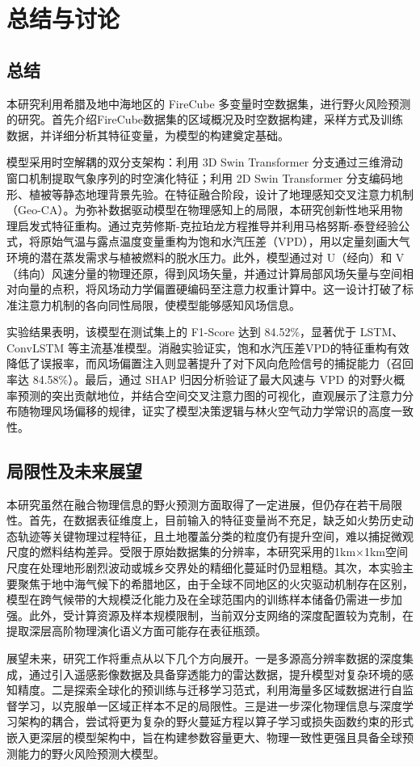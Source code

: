 \chapter{总结与讨论}
\label{chap:conclusion}

\section{总结}

本研究利用希腊及地中海地区的 FireCube 多变量时空数据集，进行野火风险预测的研究。首先介绍FireCube数据集的区域概况及时空数据构建，采样方式及训练数据，并详细分析其特征变量，为模型的构建奠定基础。

模型采用时空解耦的双分支架构：利用 3D Swin Transformer 分支通过三维滑动窗口机制提取气象序列的时空演化特征；利用 2D Swin Transformer 分支编码地形、植被等静态地理背景先验。在特征融合阶段，设计了地理感知交叉注意力机制（Geo-CA）。为弥补数据驱动模型在物理感知上的局限，本研究创新性地采用物理启发式特征重构。通过克劳修斯-克拉珀龙方程推导并利用马格努斯-泰登经验公式，将原始气温与露点温度变量重构为饱和水汽压差（VPD），用以定量刻画大气环境的潜在蒸发需求与植被燃料的脱水压力。此外，模型通过对 U（经向）和 V（纬向）风速分量的物理还原，得到风场矢量，并通过计算局部风场矢量与空间相对向量的点积，将风场动力学偏置硬编码至注意力权重计算中。这一设计打破了标准注意力机制的各向同性局限，使模型能够感知风场信息。

实验结果表明，该模型在测试集上的 F1-Score 达到 84.52\%，显著优于 LSTM、ConvLSTM 等主流基准模型。消融实验证实，饱和水汽压差VPD的特征重构有效降低了误报率，而风场偏置注入则显著提升了对下风向危险信号的捕捉能力（召回率达 84.58\%）。最后，通过 SHAP 归因分析验证了最大风速与 VPD 的对野火概率预测的突出贡献地位，并结合空间交叉注意力图的可视化，直观展示了注意力分布随物理风场偏移的规律，证实了模型决策逻辑与林火空气动力学常识的高度一致性。

\section{局限性及未来展望}

本研究虽然在融合物理信息的野火预测方面取得了一定进展，但仍存在若干局限性。首先，在数据表征维度上，目前输入的特征变量尚不充足，缺乏如火势历史动态轨迹等关键物理过程特征，且土地覆盖分类的粒度仍有提升空间，难以捕捉微观尺度的燃料结构差异。受限于原始数据集的分辨率，本研究采用的1km$\times$1km空间尺度在处理地形剧烈波动或城乡交界处的精细化蔓延时仍显粗糙。其次，本实验主要聚焦于地中海气候下的希腊地区，由于全球不同地区的火灾驱动机制存在区别，模型在跨气候带的大规模泛化能力及在全球范围内的训练样本储备仍需进一步加强。此外，受计算资源及样本规模限制，当前双分支网络的深度配置较为克制，在提取深层高阶物理演化语义方面可能存在表征瓶颈。

展望未来，研究工作将重点从以下几个方向展开。一是多源高分辨率数据的深度集成，通过引入遥感影像数据及具备穿透能力的雷达数据，提升模型对复杂环境的感知精度。二是探索全球化的预训练与迁移学习范式，利用海量多区域数据进行自监督学习，以克服单一区域正样本不足的局限性。三是进一步深化物理信息与深度学习架构的耦合，尝试将更为复杂的野火蔓延方程以算子学习或损失函数约束的形式嵌入更深层的模型架构中，旨在构建参数容量更大、物理一致性更强且具备全球预测能力的野火风险预测大模型。